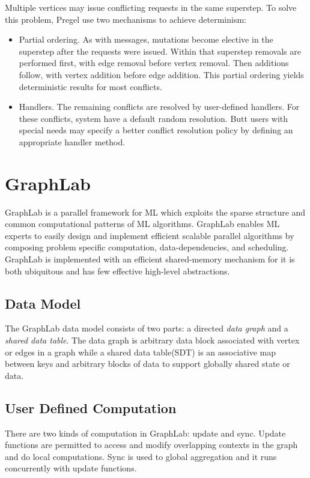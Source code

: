 \documentclass {article}
\begin{document}
Multiple vertices may issue conflicting requests in the same
superstep. To solve this problem, Pregel use two mechanisms to achieve
determinism:
\begin{itemize}
  \item Partial ordering. As with messages, mutations become elective in the superstep after the requests were
  issued. Within that superstep removals are performed first, with edge removal before vertex removal. Then additions follow, with vertex addition before edge addition. This partial ordering yields deterministic results for most conflicts.
  \item Handlers. The remaining conflicts are resolved by user-defined handlers. For these conflicts, system have a default random resolution. Butt users with special needs may specify a better conflict resolution policy by defining an appropriate handler method.
\end{itemize}

\section{GraphLab}
GraphLab is a parallel framework for ML which exploits the sparse structure and common computational patterns of ML algorithms. GraphLab
enables ML experts to easily design and implement efficient scalable parallel algorithms by composing problem
specific computation, data-dependencies, and scheduling. GraphLab is implemented with an efficient shared-memory mechanism for it is both ubiquitous and has
few effective high-level abstractions.

\subsection{Data Model}
The GraphLab data model consists of two parts: a directed \emph{data graph} and a \emph{shared data table}. The data graph is arbitrary data block associated
with vertex or edges in a graph while a shared data table(SDT) is an associative map between keys and arbitrary blocks of data to support globally shared state or data.
\subsection{User Defined Computation}
There are two kinds of computation in GraphLab: update and sync. Update functions are permitted to access and modify overlapping contexts in the graph and do local computations. Sync is used to global aggregation and it runs concurrently with update functions.
\end{document}
